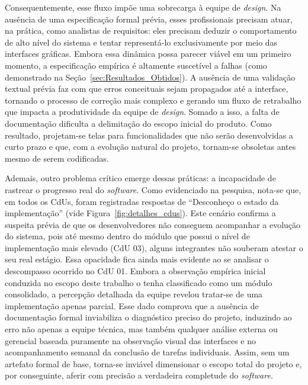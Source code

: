 Consequentemente, esse fluxo impõe uma sobrecarga à equipe de \textit{design}. Na ausência de uma especificação formal prévia, esses profissionais precisam atuar, na prática, como analistas de requisitos: eles precisam deduzir o comportamento de alto nível do sistema e tentar representá-lo exclusivamente por meio das interfaces gráficas. Embora essa dinâmica possa parecer viável em um primeiro momento, a especificação empírica é altamente suscetível a falhas (como demonstrado na Seção~\ref{sec:Resultados_Obtidos}). A ausência de uma validação textual prévia faz com que erros conceituais sejam propagados até a interface, tornando o processo de correção mais complexo e gerando um fluxo de retrabalho que impacta a produtividade da equipe de \textit{design}. Somado a isso, a falta de documentação dificulta a delimitação do escopo inicial do produto. Como resultado, projetam-se telas para funcionalidades que não serão desenvolvidas a curto prazo e que, com a evolução natural do projeto, tornam-se obsoletas antes mesmo de serem codificadas.

Ademais, outro problema crítico emerge dessas práticas: a incapacidade de rastrear o progresso real do \textit{software}. Como evidenciado na pesquisa, nota-se que, em todos os CdUs, foram registradas respostas de ``Desconheço o estado da implementação'' (vide Figura~\ref{fig:detalhes_cdus}). Este cenário confirma a suspeita prévia de que os desenvolvedores não conseguem acompanhar a evolução do sistema, pois até mesmo dentro do módulo que possui o nível de implementação mais elevado (CdU 03), alguns integrantes não souberam atestar o seu real estágio. Essa opacidade fica ainda mais evidente ao se analisar o descompasso ocorrido no CdU 01. Embora a observação empírica inicial conduzida no escopo deste trabalho o tenha classificado como um módulo consolidado, a percepção detalhada da equipe revelou tratar-se de uma implementação apenas parcial. Esse dado comprova que a ausência de documentação formal inviabiliza o diagnóstico preciso do projeto, induzindo ao erro não apenas a equipe técnica, mas também qualquer análise externa ou gerencial baseada puramente na observação visual das interfaces e no acompanhamento semanal da conclusão de tarefas individuais. Assim, sem um artefato formal de base, torna-se inviável dimensionar o escopo total do projeto e, por conseguinte, aferir com precisão a verdadeira completude do \textit{software}.

